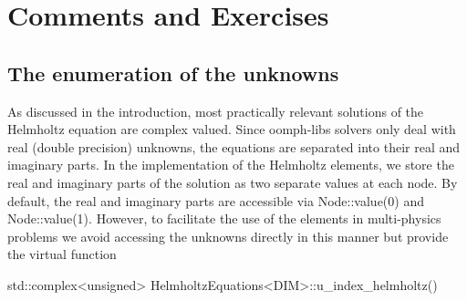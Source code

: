  
\hypertarget{index_comm_ex}{}\section{Comments and Exercises}\label{index_comm_ex}
\hypertarget{index_numbering}{}\subsection{The enumeration of the unknowns}\label{index_numbering}
As discussed in the introduction, most practically relevant solutions of the Helmholtz equation are complex valued. Since {\ttfamily oomph-\/lib\textquotesingle{}s} solvers only deal with real (double precision) unknowns, the equations are separated into their real and imaginary parts. In the implementation of the Helmholtz elements, we store the real and imaginary parts of the solution as two separate values at each node. By default, the real and imaginary parts are accessible via {\ttfamily Node\+::value(0)} and {\ttfamily Node\+::value(1)}. However, to facilitate the use of the elements in multi-\/physics problems we avoid accessing the unknowns directly in this manner but provide the virtual function 
\begin{DoxyCode}
std::complex<unsigned> HelmholtzEquations<DIM>::u\_index\_helmholtz()
\end{DoxyCode}
